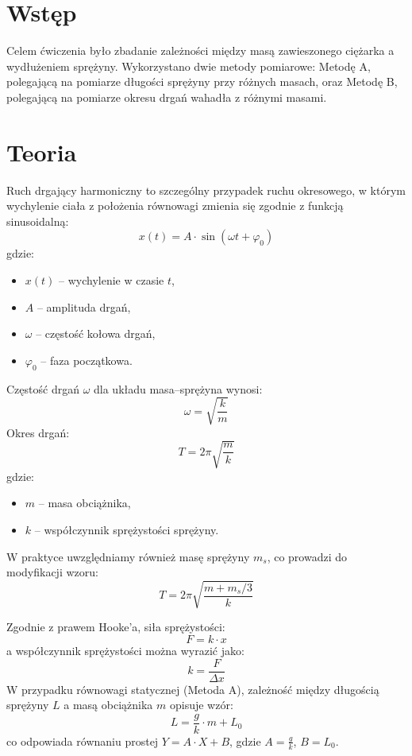 \documentclass[12pt]{article}
\begin{document}
\section*{Wstęp}
Celem ćwiczenia było zbadanie zależności między masą zawieszonego ciężarka a wydłużeniem sprężyny. 
Wykorzystano dwie metody pomiarowe: Metodę A, polegającą na pomiarze długości sprężyny przy różnych masach, 
oraz Metodę B, polegającą na pomiarze okresu drgań wahadła z różnymi masami.
\section*{Teoria}
Ruch drgający harmoniczny to szczególny przypadek ruchu okresowego, w którym wychylenie ciała z położenia równowagi zmienia się zgodnie z funkcją sinusoidalną:
\begin{equation}
x(t) = A \cdot \sin(\omega t + \varphi_0)
\end{equation}
gdzie:
\begin{itemize}
    \item \( x(t) \) – wychylenie w czasie \( t \),
    \item \( A \) – amplituda drgań,
    \item \( \omega \) – częstość kołowa drgań,
    \item \( \varphi_0 \) – faza początkowa.
\end{itemize}

Częstość drgań \( \omega \) dla układu masa–sprężyna wynosi:
\begin{equation}
\omega = \sqrt{\frac{k}{m}}
\end{equation}
Okres drgań:
\begin{equation}
T = 2\pi \sqrt{\frac{m}{k}}
\end{equation}
gdzie:
\begin{itemize}
    \item \( m \) – masa obciążnika,
    \item \( k \) – współczynnik sprężystości sprężyny.
\end{itemize}

W praktyce uwzględniamy również masę sprężyny \( m_s \), co prowadzi do modyfikacji wzoru:
\begin{equation}
T = 2\pi \sqrt{\frac{m + m_s/3}{k}}
\end{equation}

Zgodnie z prawem Hooke’a, siła sprężystości:
\begin{equation}
F = k \cdot x
\end{equation}
a współczynnik sprężystości można wyrazić jako:
\begin{equation}
k = \frac{F}{\Delta x}
\end{equation}
W przypadku równowagi statycznej (Metoda A), zależność między długością sprężyny \( L \) a masą obciążnika \( m \) opisuje wzór:
\begin{equation}
L = \frac{g}{k} \cdot m + L_0
\end{equation}
co odpowiada równaniu prostej \( Y = A \cdot X + B \), gdzie \( A = \frac{g}{k} \), \( B = L_0 \).
\end{document}
